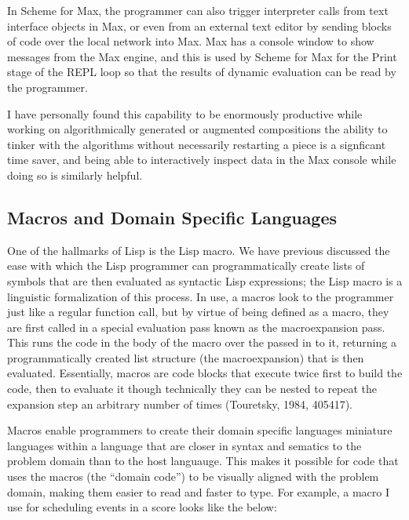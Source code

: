 \documentclass[letterpaper,10pt,english]{sphinxmanual}
\begin{document}
\sphinxAtStartPar
In Scheme for Max, the programmer can also trigger
interpreter calls from text interface objects in Max, or even from an external text editor
by sending blocks of code over the local network into Max.
Max has a console window to show messages from the Max engine, and this is used by Scheme for Max
for the Print stage of the REPL loop so that the results of dynamic evaluation can be read by the programmer.

\sphinxAtStartPar
I have personally found this capability to be enormously productive while working on
algorithmically generated or augmented compositions \sphinxhyphen{} the ability to tinker with the algorithms
without necessarily restarting a piece is a signficant time saver, and being able to interactively
inspect data in the Max console while doing so is similarly helpful.


\subsection{Macros and Domain Specific Languages}
\label{\detokenize{design:macros-and-domain-specific-languages}}
\sphinxAtStartPar
One of the hallmarks of Lisp is the Lisp macro.
We have previous discussed the ease with which the Lisp programmer can programmatically create lists of
symbols that are then evaluated as syntactic Lisp expressions; the Lisp macro is a linguistic formalization of this process.
In use, a macros look to the programmer just like a regular function call, but by virtue of being defined as a macro,
they are first called in a special evaluation pass known as the macro\sphinxhyphen{}expansion pass.
This runs the code in the body of the macro over the  passed in to it, returning a
programmatically created list structure (the macro\sphinxhyphen{}expansion) that is then evaluated.
Essentially, macros are code blocks that execute twice \sphinxhyphen{} first to build the code, then to evaluate it \sphinxhyphen{} though
technically they can be nested to repeat the expansion step an arbitrary number of times (Touretsky, 1984, 405\sphinxhyphen{}417).

\sphinxAtStartPar
Macros enable programmers to create their  domain specific languages \sphinxhyphen{}
miniature languages within a language that are closer in syntax and sematics to the problem domain than to the host languauge.
This makes it possible for code that uses the macros (the “domain code”) to be visually aligned with the problem domain,
making them easier to read and faster to type.
For example, a macro I use for scheduling events in a score looks like the below:
\end{document}
